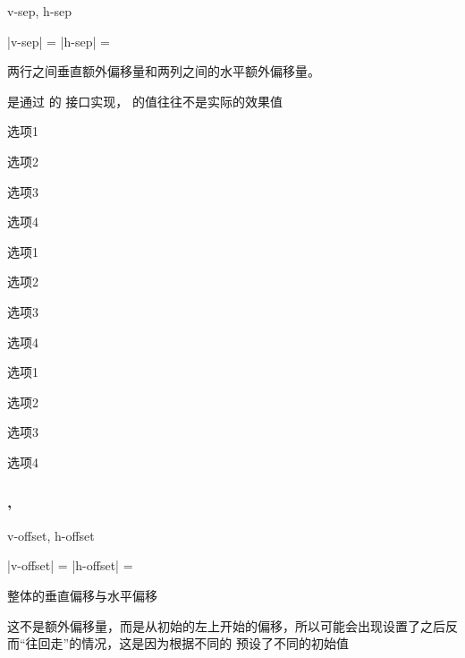 \documentclass{xdyy-usermanual}
\begin{document}
\begin{function}{v-sep, h-sep}
  \begin{syntax}
    |v-sep| =   \init{0pt}
    |h-sep| =   \init{0pt}
  \end{syntax}
  两行之间垂直额外偏移量和两列之间的水平额外偏移量。
  \begin{remark}
     是通过  的  接口实现， 的值往往不是实际的效果值
  \end{remark}
\end{function}

\begin{vexample}
    \begin{xchoices}[items = 2, h-sep = 4em]
      \item 选项1
      \item 选项2
      \item 选项3
      \item 选项4
    \end{xchoices}
\end{vexample}

\begin{vexample}
    \begin{xchoices}[items = 2]
      \item 选项1
      \item 选项2
      \item 选项3
      \item 选项4
    \end{xchoices}
\end{vexample}

\begin{vexample}
    \begin{xchoices}[items = 2, v-sep = 1em]
      \item 选项1
      \item 选项2
      \item 选项3
      \item 选项4
    \end{xchoices}
\end{vexample}



\subsubsection{ ,  }


\begin{function}{v-offset, h-offset}
  \begin{syntax}
    |v-offset| = 
    |h-offset| = 
  \end{syntax}
  整体的垂直偏移与水平偏移
  \begin{remark}
    这不是额外偏移量，而是从初始的左上开始的偏移，所以可能会出现设置了之后反而“往回走”的情况，这是因为根据不同的  预设了不同的初始值
  \end{remark}
\end{function}
\end{document}
